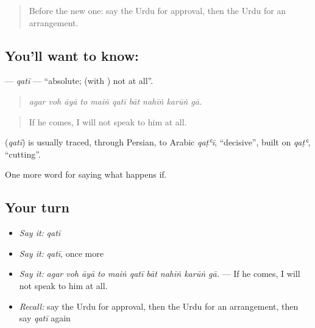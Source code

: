 \label{lesson:UR-C383-qati}



\begin{quote}
Before the new one: say the Urdu for approval, then the Urdu for an arrangement.
\end{quote}

\subsection*{You'll want to know: }
\textbf{} — \emph{qatī} — \textquotedblleft{}absolute; (with ) not at all\textquotedblright{}.

\begin{quote}
         
\end{quote}

\begin{quote}
\emph{agar voh āyā to maiṅ qatī bāt nahīṅ karūṅ gā.}
\end{quote}

\begin{quote}
If he comes, I will not speak to him at all.
\end{quote}

\begin{cousinweb}
\textbf{} (\emph{qatī}) is usually traced, through Persian, to Arabic \emph{qaṭʿī}, \textquotedblleft{}decisive\textquotedblright{}, built on \emph{qaṭʿ}, \textquotedblleft{}cutting\textquotedblright{}.
\end{cousinweb}

\begin{grammarlens}[title={What you've built}]
One more word for saying what happens if.
\end{grammarlens}

\subsection*{Your turn}
\begin{itemize}
\raggedright
  \item \emph{Say it:} \emph{qatī}
  \item \emph{Say it:} \emph{qatī}, once more
  \item \emph{Say it:} \emph{agar voh āyā to maiṅ qatī bāt nahīṅ karūṅ gā.} — If he comes, I will not speak to him at all.
  \item \emph{Recall:} say the Urdu for approval, then the Urdu for an arrangement, then say \emph{qatī} again
\end{itemize}

